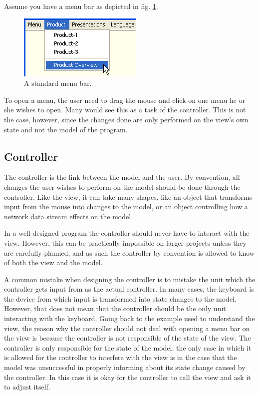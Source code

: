 Assume you have a menu bar as depicted in fig. \ref{fig:menubar}.

\begin{figure}[H]
\begin{centering}
\includegraphics{MenuBar}
\par\end{centering}

\caption{\label{fig:menubar}A standard menu bar.}
\end{figure}


To open a menu, the user need to drag the mouse and click on one menu
he or she wishes to open. Many would see this as a task of the controller.
This is not the case, however, since the changes done are only performed
on the view's own state and not the model of the program.


\subsection{Controller}

The controller is the link between the model and the user. By convention,
all changes the user wishes to perform on the model should be done
through the controller. Like the view, it can take many shapes, like
an object that transforms input from the mouse into changes to the
model, or an object controlling how a network data stream effects
on the model. 

In a well-designed program the controller should never have to interact
with the view. However, this can be practically impossible on larger
projects unless they are carefully planned, and as such the controller
by convention is allowed to know of both the view and the model.

A common mistake when designing the controller is to mistake the unit
which the controller gets input from as the actual controller. In
many cases, the keyboard is the device from which input is transformed
into state changes to the model. However, that does not mean that
the controller should be the only unit interacting with the keyboard.
Going back to the example used to understand the view, the reason
why the controller should not deal with opening a menu bar on the
view is because the controller is not responsible of the state of
the view. The controller is only responsible for the state of the
model; the only case in which it is allowed for the controller to
interfere with the view is in the case that the model was unsuccessful
in properly informing about its state change caused by the controller.
In this case it is okay for the controller to call the view and ask
it to adjust itself. 


